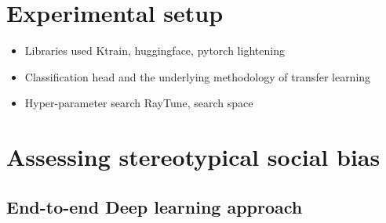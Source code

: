 \section{Experimental setup}
\begin{itemize}
    \item Libraries used {Ktrain, huggingface, pytorch lightening}
    \item Classification head and the underlying methodology of transfer learning 
    \item Hyper-parameter search {RayTune}, search space
\end{itemize}
\section{Assessing stereotypical social bias}
\subsection{End-to-end Deep learning approach}
